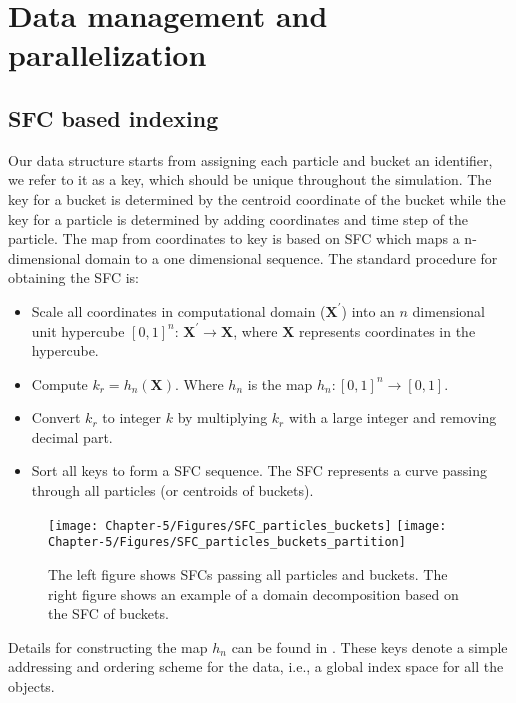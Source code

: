\section{Data management and parallelization}
\subsection{SFC based indexing}
Our data structure starts from assigning each particle and bucket an identifier, we refer to it as a key, which should be unique throughout the simulation. The key for a bucket is determined by the centroid coordinate of the bucket while the key for a particle is determined by adding coordinates and time step of the particle. The map from coordinates to key is based on SFC \citep{sagan2012space} which maps a n-dimensional domain to a one dimensional sequence. The standard procedure for obtaining the SFC is: 
\begin{itemize}
\item Scale all coordinates in computational domain ($\textbf{X}^\prime$) into an $n$ dimensional unit hypercube $[0,1]^n $: $\textbf{X}^\prime \rightarrow \textbf{X}$, where $\textbf{X}$ represents coordinates in the hypercube.
\item Compute $k_r = h_n(\textbf{X})$. Where $h_n$ is the map $h_n: [0,1]^n \rightarrow [0,1]$. 
\item Convert $k_r$ to integer $k$ by multiplying $k_r$ with a large integer and removing decimal part.
\item Sort all keys to form a SFC sequence. The SFC represents a curve passing through all particles (or centroids of buckets).
\end{itemize}
%
\begin{figure*}[!t]
\centering
\texttt{[image: Chapter-5/Figures/SFC\_particles\_buckets]}
\hfil
\texttt{[image: Chapter-5/Figures/SFC\_particles\_buckets\_partition]}
\caption{The left figure shows SFCs passing all particles and buckets. The right figure shows an example of a domain decomposition based on the SFC of buckets.}
\label{fig:SFC_domain_decomposition}
\end{figure*}

Details for constructing the map $h_n$ can be found in \citep{patra1995problem}. These keys denote a simple addressing and ordering scheme for the data, i.e., a global index space for all the objects.

